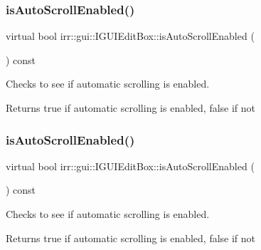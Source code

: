 \subsubsection{\texorpdfstring{is\+Auto\+Scroll\+Enabled()}{isAutoScrollEnabled()}\hspace{0.1cm}{\footnotesize\ttfamily [1/2]}}
{\footnotesize\ttfamily virtual bool irr\+::gui\+::\+I\+G\+U\+I\+Edit\+Box\+::is\+Auto\+Scroll\+Enabled (\begin{DoxyParamCaption}{ }\end{DoxyParamCaption}) const\hspace{0.3cm}{\ttfamily [pure virtual]}}



Checks to see if automatic scrolling is enabled. 

\begin{DoxyReturn}{Returns}
true if automatic scrolling is enabled, false if not 
\end{DoxyReturn}
\mbox{\label{classirr_1_1gui_1_1IGUIEditBox_a4ccf066d1198f3548c7d04622067917f}} 
\subsubsection{\texorpdfstring{is\+Auto\+Scroll\+Enabled()}{isAutoScrollEnabled()}\hspace{0.1cm}{\footnotesize\ttfamily [2/2]}}
{\footnotesize\ttfamily virtual bool irr\+::gui\+::\+I\+G\+U\+I\+Edit\+Box\+::is\+Auto\+Scroll\+Enabled (\begin{DoxyParamCaption}{ }\end{DoxyParamCaption}) const\hspace{0.3cm}{\ttfamily [pure virtual]}}



Checks to see if automatic scrolling is enabled. 

\begin{DoxyReturn}{Returns}
true if automatic scrolling is enabled, false if not 
\end{DoxyReturn}
\mbox{\label{classirr_1_1gui_1_1IGUIEditBox_a0be3338bc094fc93c9f0e4ed842835d6}} 
